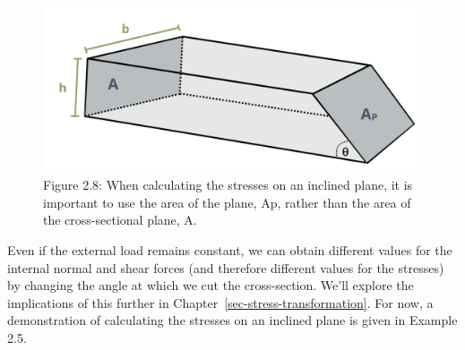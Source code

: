 \documentclass[
  letterpaper,
  DIV=11,
  numbers=noendperiod]{scrreprt}
\theoremstyle{definition}
\theoremstyle{remark}
\begin{document}
\begin{figure}[H]

{\centering \includegraphics{images/CH2 figures/2.8.png}

}

\caption{Figure 2.8: When calculating the stresses on an inclined plane,
it is important to use the area of the plane, Ap, rather than the area
of the cross-sectional plane, A.}

\end{figure}%

Even if the external load remains constant, we can obtain different
values for the internal normal and shear forces (and therefore different
values for the stresses) by changing the angle at which we cut the
cross-section. We'll explore the implications of this further in
Chapter~\ref{sec-stress-transformation}. For now, a demonstration of
calculating the stresses on an inclined plane is given in Example 2.5.
\end{document}
